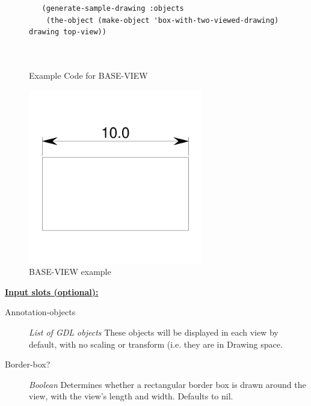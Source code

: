 \documentclass [11pt]{book}
\begin{document}
\begin{itemize}
\begin{figure}
\begin{lrbox}{\boxedverb}
\begin{minipage}{\linewidth}
{\begin{verbatim}
   (generate-sample-drawing :objects 
    (the-object (make-object 'box-with-two-viewed-drawing) drawing top-view))
 
 
\end{verbatim}}
\end{minipage}
\end{lrbox}
\fbox{\usebox{\boxedverb}}

\caption{Example Code for BASE-VIEW}

\label{fig:example-code-BASE-VIEW}

\end{figure}

\begin{figure}
\begin{center}
\includegraphics[width=3in,height=3in]{../images/example-BASE-VIEW.pdf}
\end{center}

\caption{BASE-VIEW example}

\label{fig:BASE-VIEW}

\end{figure}





\textbf{
\underline{Input slots (optional):}}

\begin{description}

\item [Annotation-objects]
\emph{List of GDL objects} These objects will be displayed in each view by default, with no scaling or transform (i.e. they are in Drawing space.


\item [Border-box?]
\emph{Boolean} Determines whether a rectangular border box is drawn around the view,
with the view's length and width. Defaults to nil.



\end{description}
\end{itemize}
\end{document}
